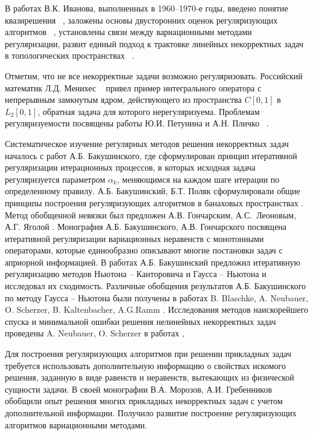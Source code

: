 {В работах В.К. Иванова, выполненных в 1960--1970-е годы, введено понятие квазирешения ~\cite{Iv1962_2, Iv1963},  заложены основы двусторонних оценок регуляризующих алгоритмов ~\cite{Iv1966}, установлены связи между вариационными методами регуляризации, развит единый подход к трактовке линейных некорректных задач в топологических пространствах ~\cite{Iv1967}. 

Отметим, что не все некорректные задачи возможно регуляризовать. Российский математик Л.Д. Менихес ~\cite{Menih1978} привел пример интегрального оператора с непрерывным замкнутым ядром, действующего из пространства \( C[0,1] \) в \( L_2[0,1] \), обратная задача для которого нерегуляризуема. Проблемам регуляризуемости посвящены работы Ю.И. Петунина и А.Н. Пличко ~\cite{PetPlich1980}.

Систематическое изучение регулярных методов решения некорректных задач началось с работ А.Б. Бакушинского, где сформулирован принцип итеративной регуляризации итерационных процессов, в которых исходная задача регуляризуется параметром $\alpha_k$, меняющимся на каждом шаге итерации по определенному правилу. А.Б. Бакушинский, Б.Т. Поляк сформулировали общие принципы построения регуляризующих алгоритмов в банаховых пространствах \cite{BakPol1974}. Метод обобщенной невязки был предложен А.В. Гончарским, А.С.~Леоновым, А.Г. Яголой \cite{GonLeoYag1973}. Монография А.Б. Бакушинского, А.В. Гончарского \cite{BakGon1989} посвящена итеративной регуляризации вариационных неравенств с монотонными операторами, которые единообразно описывают многие постановки задач с априорной информацией. В работах \cite{Bak1976,Bak1992} А.Б. Бакушинский предложил итеративную регуляризацию методов Ньютона -- Канторовича и Гаусса -- Ньютона и исследовал их сходимость. Различные обобщения результатов А.Б. Бакушинского по методу Гаусса -- Ньютона были получены в работах B. Blaschke, A. Neubauer, O. Scherzer, B. Kaltenbacher, A.G.Ramm \cite{BlaNeuSch1997,KalNeuRam2002}. Исследования методов наискорейшего спуска и минимальной ошибки решения нелинейных некорректных задач проведены A. Neubauer, O. Scherzer в работах  \cite{NeuSch1995_1,NeuSch1995_2,Sch1995},

Для построения регуляризующих алгоритмов при решении прикладных задач требуется использовать дополнительную информацию о свойствах искомого решения, заданную в виде равенств и неравенств, вытекающих из физической сущности задачи. В своей монографии \cite{MorGre1992} В.А. Морозов, А.И. Гребенников обобщили опыт решения многих прикладных  некорректных задач с учетом дополнительной информации. Получило развитие построение регуляризующих алгоритмов вариационными методами. 

}
